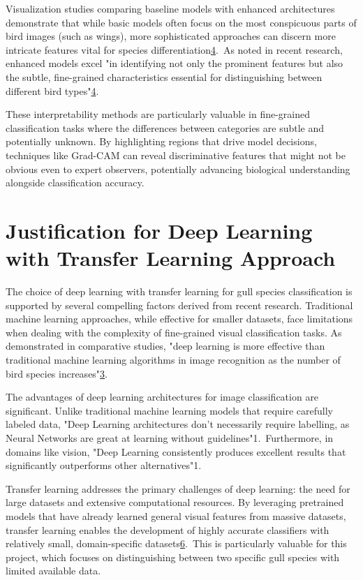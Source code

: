 \documentclass[a4paper,12pt]{article}
\begin{document}
Visualization studies comparing baseline models with enhanced architectures demonstrate that while basic models often focus on the most conspicuous parts of bird images (such as wings), more sophisticated approaches can discern more intricate features vital for species differentiation\href{https://www.frontiersin.org/journals/neurorobotics/articles/10.3389/fnbot.2024.1391791/full}{4}. As noted in recent research, enhanced models excel "in identifying not only the prominent features but also the subtle, fine-grained characteristics essential for distinguishing between different bird types"\href{https://www.frontiersin.org/journals/neurorobotics/articles/10.3389/fnbot.2024.1391791/full}{4}.

These interpretability methods are particularly valuable in fine-grained classification tasks where the differences between categories are subtle and potentially unknown. By highlighting regions that drive model decisions, techniques like Grad-CAM can reveal discriminative features that might not be obvious even to expert observers, potentially advancing biological understanding alongside classification accuracy.

\section*{Justification for Deep Learning with Transfer Learning Approach}
The choice of deep learning with transfer learning for gull species classification is supported by several compelling factors derived from recent research. Traditional machine learning approaches, while effective for smaller datasets, face limitations when dealing with the complexity of fine-grained visual classification tasks. As demonstrated in comparative studies, "deep learning is more effective than traditional machine learning algorithms in image recognition as the number of bird species increases"\href{https://ijece.iaescore.com/index.php/IJECE/article/view/24833}{3}.

The advantages of deep learning architectures for image classification are significant. Unlike traditional machine learning models that require carefully labeled data, "Deep Learning architectures don't necessarily require labelling, as Neural Networks are great at learning without guidelines"1. Furthermore, in domains like vision, "Deep Learning consistently produces excellent results that significantly outperforms other alternatives"1.

Transfer learning addresses the primary challenges of deep learning: the need for large datasets and extensive computational resources. By leveraging pretrained models that have already learned general visual features from massive datasets, transfer learning enables the development of highly accurate classifiers with relatively small, domain-specific datasets\href{https://arxiv.org/abs/2201.09679}{6}. This is particularly valuable for this project, which focuses on distinguishing between two specific gull species with limited available data.
\end{document}
